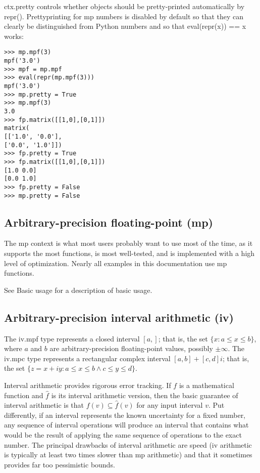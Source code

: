 ctx.pretty controls whether objects should be pretty-printed automatically by repr(). Prettyprinting for mp numbers is disabled by default so that they can clearly be distinguished from Python numbers and so that eval(repr(x)) == x works:

\begin{lstlisting}
>>> mp.mpf(3)
mpf('3.0')
>>> mpf = mp.mpf
>>> eval(repr(mp.mpf(3)))
mpf('3.0')
>>> mp.pretty = True
>>> mp.mpf(3)
3.0
>>> fp.matrix([[1,0],[0,1]])
matrix(
[['1.0', '0.0'],
['0.0', '1.0']])
>>> fp.pretty = True
>>> fp.matrix([[1,0],[0,1]])
[1.0 0.0]
[0.0 1.0]
>>> fp.pretty = False
>>> mp.pretty = False
\end{lstlisting}



\subsection{Arbitrary-precision floating-point (mp)}  

The mp context is what most users probably want to use most of the time, as it supports the most functions, is most well-tested, and is implemented with a high level of optimization. Nearly all examples in this documentation use mp functions.

See Basic usage for a description of basic usage.


\subsection{Arbitrary-precision interval arithmetic (iv)}  

The iv.mpf type represents a closed interval $[a,]$; that is, the set $\{x: a \leq x \leq b\}$, where $a$ and $b $ are arbitrary-precision floating-point values, possibly $\pm\infty$. The iv.mpc type represents a rectangular complex interval $[a,b] + [c,d]i$; that is, the set $\{z=x+iy: a \leq x \leq b \wedge c \leq y \leq d\}$.

\vpara
Interval arithmetic provides rigorous error tracking. If  $f$ is a mathematical function and $\hat{f}$ is its interval arithmetic version, then the basic guarantee of interval arithmetic is that $f(v) \subseteq \hat{f}(v)$ for any input interval $v$. Put differently, if an interval represents the known uncertainty for a fixed number, any sequence of interval operations will produce an interval that contains what would be the result of applying the same sequence of operations to the exact number. The principal drawbacks of interval arithmetic are speed (iv arithmetic is typically at least two times slower than mp arithmetic) and that it sometimes provides far too pessimistic bounds.

